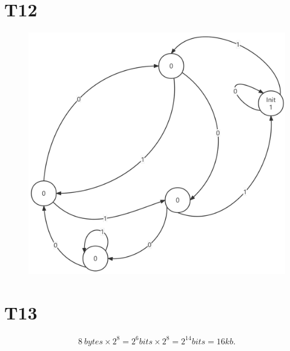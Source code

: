 \documentclass{article}
\begin{document}
\section*{T12}
\begin{figure}[htbp]
    \centering
    \includegraphics[scale=0.15]{picture/T12.png}
\end{figure}

\section*{T13}
\[
    8\ bytes\times 2^{8}=2^{6}bits \times 2^{8}= 2^{14}bits =16kb.
\]
\end{document}
